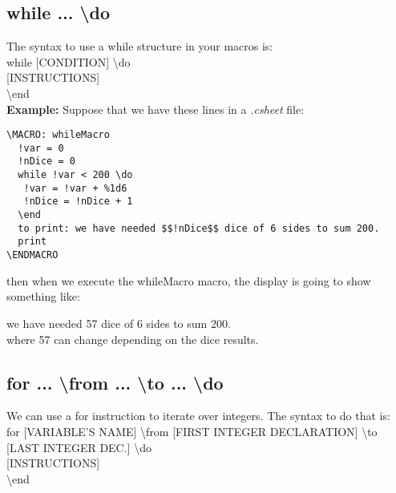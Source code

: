\documentclass[11pt,a4paper,openright,oneside]{book}
\newenvironment{ex}
{
  \setlength{\parindent}{0cm}
  \large \textbf{Example:} \normalsize 
}
{}
\begin{document}
\subsection{\textsf{while ... \textbackslash do}}

The syntax to use a \textsf{while} structure in your macros is: \vspace{5px} \\
\textsf{while \textsc{\scriptsize[CONDITION]} \textbackslash do} \\
\textsc{\scriptsize[INSTRUCTIONS]} \\
\textsf{\textbackslash end} \\

\begin{ex} Suppose that we have these lines in a \textit{.csheet} file:
  \begin{lstlisting}
\MACRO: whileMacro
  !var = 0
  !nDice = 0
  while !var < 200 \do
   !var = !var + %1d6
   !nDice = !nDice + 1
  \end
  to print: we have needed $$!nDice$$ dice of 6 sides to sum 200.
  print
\ENDMACRO
  \end{lstlisting}
then when we execute the \textsf{whileMacro} macro, the display is going to show something like:
\vspace{5px}

\textsf{we have needed 57 dice of 6 sides to sum 200.} \\

where 57 can change depending on the dice results.

\end{ex}

\subsection{\textsf{for ... \textbackslash from ... \textbackslash to ... \textbackslash do}}

We can use a \textsf{for} instruction to iterate over integers. The syntax to do that is: \vspace{5px} \\
\textsf{for \textsc{\scriptsize[VARIABLE'S NAME]} \textbackslash from \textsc{\scriptsize[FIRST INTEGER DECLARATION]} \textbackslash to \textsc{\scriptsize[LAST INTEGER DEC.]} \textbackslash do} \\
\textsc{\scriptsize[INSTRUCTIONS]} \\
\textsf{\textbackslash end} \\
\end{document}
